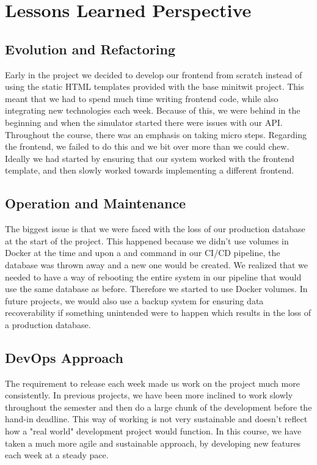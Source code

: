 \chapter{Lessons Learned Perspective}

\section{Evolution and Refactoring}


Early in the project we decided to develop our frontend from scratch instead of using the static HTML templates provided with the base minitwit project. This meant that we had to spend much time writing frontend code, while also integrating new technologies each week. Because of this, we were behind in the beginning and when the simulator started there were issues with our API. Throughout the course, there was an emphasis on taking micro steps. Regarding the frontend, we failed to do this and we bit over more than we could chew. Ideally we had started by ensuring that our system worked with the frontend template, and then slowly worked towards implementing a different frontend.


\section{Operation and Maintenance}

The biggest issue is that we were faced with the loss of our production database at the start of the project. This happened because we didn't use volumes in Docker at the time and upon a  and  command in our \gls{CI}/\gls{CD} pipeline, the database was thrown away and a new one would be created. We realized that we needed to have a way of rebooting the entire system in our pipeline that would use the same database as before. Therefore we started to use Docker volumes. In future projects, we would also use a backup system for ensuring data recoverability if something unintended were to happen which results in the loss of a production database.

\section{DevOps Approach}

The requirement to release each week made us work on the project much more consistently. In previous projects, we have been more inclined to work slowly throughout the semester and then do a large chunk of the development before the hand-in deadline. This way of working is not very sustainable and doesn't reflect how a "real world" development project would function. In this course, we have taken a much more agile and sustainable approach, by developing new features each week at a steady pace.\\

